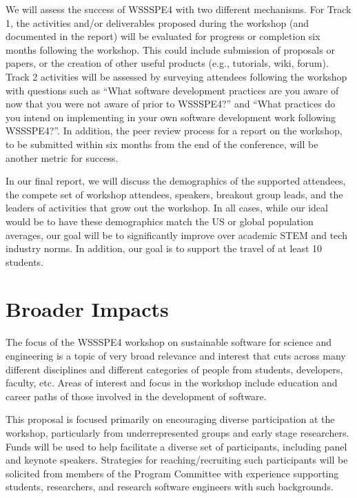 \documentclass[11pt]{article}
\begin{document}
We will assess the success of WSSSPE4 with two different mechanisms.
For Track 1, the activities and\slash or deliverables proposed during the workshop (and documented in the report) will be evaluated for progress or completion six months following the workshop.
This could include submission of proposals or papers, or the creation of other useful products (e.g., tutorials, wiki, forum).
Track 2 activities will be assessed by surveying attendees following the workshop with questions such as ``What software development practices are you aware of now that you were not aware of prior to WSSSPE4?'' and ``What practices do you intend on implementing in your own software development work following WSSSPE4?''.
In addition, the peer review process for a report on the workshop, to be submitted within six months from the end of the conference, will be another metric for success.

In our final report, we will discuss the demographics of the supported attendees, the compete set of workshop attendees, speakers, breakout group leads, and the leaders of activities that grow out the workshop. In all cases, while our ideal would be to have these demographics match the US or global population averages, our goal will be to significantly improve over academic STEM and tech industry norms.
In addition, our goal is to support the travel of at least 10 students.

\section{Broader Impacts} 

The focus of the WSSSPE4 workshop on sustainable software for science and engineering is a topic of very broad relevance and interest that cuts across many different disciplines and different categories of people from students, developers, faculty, etc. Areas of interest and focus in the workshop include education and career paths of those involved in the development of software.

This proposal is focused primarily on encouraging diverse participation at the workshop, particularly from underrepresented groups and early stage researchers. Funds will be used to help facilitate a diverse set of participants, including panel and keynote speakers. 
Strategies for reaching\slash recruiting such participants will be solicited from members of the Program Committee with experience supporting students, researchers, and research software engineers with such backgrounds.
\end{document}
